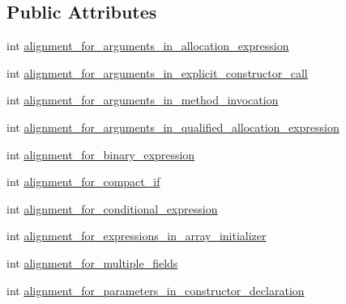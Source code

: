 \subsection*{Public Attributes}
\begin{DoxyCompactItemize}
\item 
int \hyperlink{classorg_1_1eclipse_1_1jdt_1_1ui_1_1tests_1_1refactoring_1_1infra_1_1TestFormatterOptions_aa9381964dd9c2783e50c8863bb01e258}{alignment\_\-for\_\-arguments\_\-in\_\-allocation\_\-expression}
\item 
int \hyperlink{classorg_1_1eclipse_1_1jdt_1_1ui_1_1tests_1_1refactoring_1_1infra_1_1TestFormatterOptions_a1969dae5226367231e2c03e47fec5161}{alignment\_\-for\_\-arguments\_\-in\_\-explicit\_\-constructor\_\-call}
\item 
int \hyperlink{classorg_1_1eclipse_1_1jdt_1_1ui_1_1tests_1_1refactoring_1_1infra_1_1TestFormatterOptions_a9c6b6f86192b2f57811a491db99186f8}{alignment\_\-for\_\-arguments\_\-in\_\-method\_\-invocation}
\item 
int \hyperlink{classorg_1_1eclipse_1_1jdt_1_1ui_1_1tests_1_1refactoring_1_1infra_1_1TestFormatterOptions_a9a110fe53e623fc80a51ca64fa3163ba}{alignment\_\-for\_\-arguments\_\-in\_\-qualified\_\-allocation\_\-expression}
\item 
int \hyperlink{classorg_1_1eclipse_1_1jdt_1_1ui_1_1tests_1_1refactoring_1_1infra_1_1TestFormatterOptions_aae0d607a79818772357c789060b5a0d3}{alignment\_\-for\_\-binary\_\-expression}
\item 
int \hyperlink{classorg_1_1eclipse_1_1jdt_1_1ui_1_1tests_1_1refactoring_1_1infra_1_1TestFormatterOptions_a3dbe75c0bae304fe8333e9567495ccc5}{alignment\_\-for\_\-compact\_\-if}
\item 
int \hyperlink{classorg_1_1eclipse_1_1jdt_1_1ui_1_1tests_1_1refactoring_1_1infra_1_1TestFormatterOptions_a95bb421224fdf92c3e7e2e4854162450}{alignment\_\-for\_\-conditional\_\-expression}
\item 
int \hyperlink{classorg_1_1eclipse_1_1jdt_1_1ui_1_1tests_1_1refactoring_1_1infra_1_1TestFormatterOptions_a291275c3589fd83ba6fbb13156ab1f6e}{alignment\_\-for\_\-expressions\_\-in\_\-array\_\-initializer}
\item 
int \hyperlink{classorg_1_1eclipse_1_1jdt_1_1ui_1_1tests_1_1refactoring_1_1infra_1_1TestFormatterOptions_a00cd0dc0d5af891a329cd02b6563a530}{alignment\_\-for\_\-multiple\_\-fields}
\item 
int \hyperlink{classorg_1_1eclipse_1_1jdt_1_1ui_1_1tests_1_1refactoring_1_1infra_1_1TestFormatterOptions_a8c06b694d869d61b9cecb41624111b92}{alignment\_\-for\_\-parameters\_\-in\_\-constructor\_\-declaration}

\end{DoxyCompactItemize}
